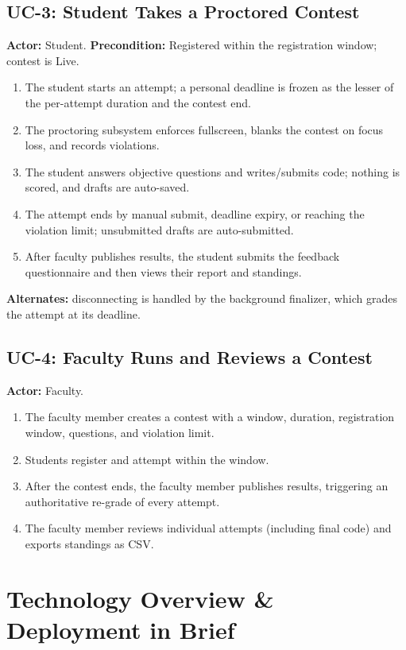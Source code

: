 \documentclass[12pt,a4paper,oneside]{report}
\begin{document}
\section{UC-3: Student Takes a Proctored Contest}
\textbf{Actor:} Student. \quad \textbf{Precondition:} Registered within the
registration window; contest is Live.
\begin{enumerate}[leftmargin=1.6em]
  \item The student starts an attempt; a personal deadline is frozen as the
        lesser of the per-attempt duration and the contest end.
  \item The proctoring subsystem enforces fullscreen, blanks the contest on focus
        loss, and records violations.
  \item The student answers objective questions and writes/submits code; nothing
        is scored, and drafts are auto-saved.
  \item The attempt ends by manual submit, deadline expiry, or reaching the
        violation limit; unsubmitted drafts are auto-submitted.
  \item After faculty publishes results, the student submits the feedback
        questionnaire and then views their report and standings.
\end{enumerate}
\textbf{Alternates:} disconnecting is handled by the background finalizer, which
grades the attempt at its deadline.

\section{UC-4: Faculty Runs and Reviews a Contest}
\textbf{Actor:} Faculty.
\begin{enumerate}[leftmargin=1.6em]
  \item The faculty member creates a contest with a window, duration,
        registration window, questions, and violation limit.
  \item Students register and attempt within the window.
  \item After the contest ends, the faculty member publishes results, triggering
        an authoritative re-grade of every attempt.
  \item The faculty member reviews individual attempts (including final code) and
        exports standings as CSV.
\end{enumerate}

\chapter{Technology Overview \& Deployment in Brief}
\end{document}
